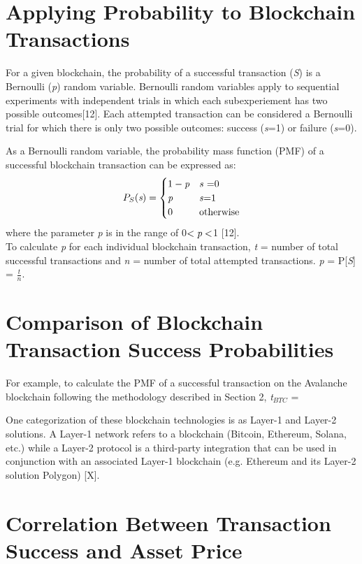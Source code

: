 \documentclass[12pt]{article}
\begin{document}
\section{Applying Probability to Blockchain Transactions}
For a given blockchain, the probability of a successful transaction (\emph{S}) is a Bernoulli (\emph{p}) random variable. Bernoulli random variables apply to sequential experiments with independent trials in which each subexperiement has two possible outcomes[12]. Each attempted transaction can be considered a Bernoulli trial for which there is only two possible outcomes: success (\emph{s}=1) or failure (\emph{s}=0). 	

As a Bernoulli random variable, the probability mass function (PMF) of a successful blockchain transaction can be expressed as:
\[
P_{S}(\emph{s}) =
\begin{cases}
1-\emph{p}&\text{\emph{s} =0}\\
\emph{p}&\text{\emph{s}=1}\\
0&\text{otherwise}\\
\end{cases}
\]
where the parameter \emph{p} is in the range of 0$<\emph{p}<$1 [12].\\

To calculate \emph{p} for each individual blockchain transaction, \emph{t} = number of total successful transactions and \emph{n} = number of total attempted transactions. \emph{p} = P[\emph{S}] = \(\frac{t}{n}\). 


\section{Comparison of Blockchain Transaction Success Probabilities}

For example, to calculate the PMF of a successful transaction on the Avalanche blockchain following the methodology described in Section 2, \emph{t$_{BTC}$} = 

One categorization of these blockchain technologies is as Layer-1 and Layer-2 solutions. A Layer-1 network refers to a blockchain (Bitcoin, Ethereum, Solana, etc.) while a Layer-2 protocol is a third-party integration that can be used in conjunction with an associated Layer-1 blockchain (e.g. Ethereum and its Layer-2 solution Polygon) [X].

\section{Correlation Between Transaction Success and Asset Price}
\end{document}

